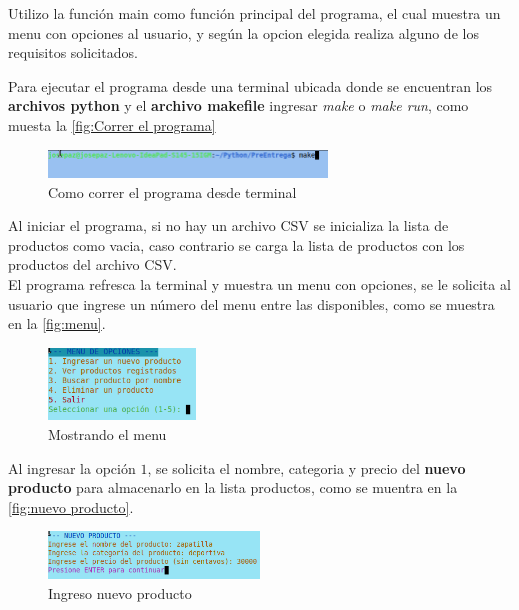 \documentclass[12pt]{article}
\begin{document}
Utilizo la función main como función principal del programa, el cual muestra un menu con opciones al usuario, y según la opcion elegida realiza alguno de los requisitos solicitados.

Para ejecutar el programa desde una terminal ubicada donde se encuentran los \textbf{archivos python} y el \textbf{archivo makefile} ingresar \textit{make} o \textit{make run}, como muesta la \autoref{fig:Correr el programa}

\begin{figure}[H]
	\centering
	\setlength{\fboxrule}{0pt}
	\includegraphics[width=0.66\textwidth]{Imagenes/img0.png}
	\caption{Como correr el programa desde terminal}
	\label{fig:Correr el programa}
\end{figure}  

Al iniciar el programa, si no hay un archivo CSV se inicializa la lista de productos como vacia, caso contrario se carga la lista de productos con los productos del archivo CSV.\\

El programa refresca la terminal y muestra un menu con opciones, se le solicita al usuario que ingrese un número del menu entre las disponibles, como se muestra en la \autoref{fig:menu}.

\begin{figure}[H]
	\centering
	\setlength{\fboxrule}{0pt}
	\includegraphics[width=0.35\textwidth]{Imagenes/menu.png}
	\caption{Mostrando el menu}
	\label{fig:menu}
\end{figure} 

Al ingresar la opción $1$, se solicita el nombre, categoria y precio del \textbf{nuevo producto} para almacenarlo en la lista productos, como se muentra en la \autoref{fig:nuevo producto}.

\begin{figure}[H]
	\centering
	\setlength{\fboxrule}{0pt}
	\includegraphics[width=0.5\textwidth]{Imagenes/nuevo_producto.png}
	\caption{Ingreso nuevo producto}
	\label{fig:nuevo producto}
\end{figure} 
\end{document}
